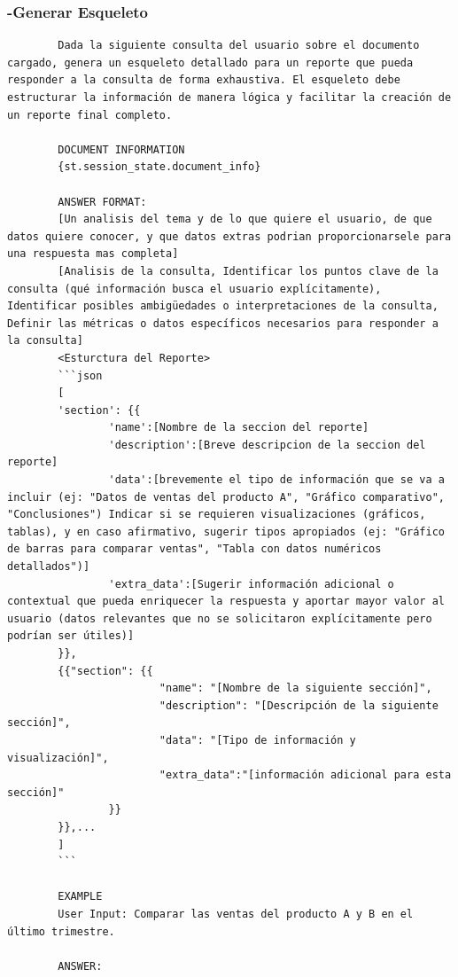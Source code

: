 \begin{anexos}
	\subsubsection{-Generar Esqueleto}
	\begin{lstlisting}
		Dada la siguiente consulta del usuario sobre el documento cargado, genera un esqueleto detallado para un reporte que pueda responder a la consulta de forma exhaustiva. El esqueleto debe estructurar la información de manera lógica y facilitar la creación de un reporte final completo.
		
		DOCUMENT INFORMATION
		{st.session_state.document_info}
		
		ANSWER FORMAT:
		[Un analisis del tema y de lo que quiere el usuario, de que datos quiere conocer, y que datos extras podrian proporcionarsele para una respuesta mas completa]
		[Analisis de la consulta, Identificar los puntos clave de la consulta (qué información busca el usuario explícitamente), Identificar posibles ambigüedades o interpretaciones de la consulta, Definir las métricas o datos específicos necesarios para responder a la consulta]
		<Esturctura del Reporte>
		```json
		[
		'section': {{
				'name':[Nombre de la seccion del reporte]
				'description':[Breve descripcion de la seccion del reporte]
				'data':[brevemente el tipo de información que se va a incluir (ej: "Datos de ventas del producto A", "Gráfico comparativo", "Conclusiones") Indicar si se requieren visualizaciones (gráficos, tablas), y en caso afirmativo, sugerir tipos apropiados (ej: "Gráfico de barras para comparar ventas", "Tabla con datos numéricos detallados")]
				'extra_data':[Sugerir información adicional o contextual que pueda enriquecer la respuesta y aportar mayor valor al usuario (datos relevantes que no se solicitaron explícitamente pero podrían ser útiles)]
		}},
		{{"section": {{
						"name": "[Nombre de la siguiente sección]",
						"description": "[Descripción de la siguiente sección]",
						"data": "[Tipo de información y visualización]",
						"extra_data":"[información adicional para esta sección]"
				}}
		}},...
		]
		```
		
		EXAMPLE
		User Input: Comparar las ventas del producto A y B en el último trimestre.
		
		ANSWER:
		

\end{lstlisting}
\end{anexos}
